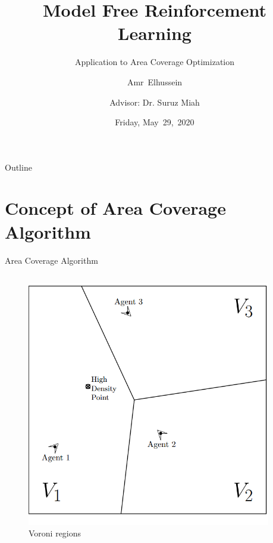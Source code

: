 \documentclass{beamer}
\title{Model Free Reinforcement Learning}
\subtitle{Application to Area Coverage Optimization}
\author[A.Elhussein]{Amr~Elhussein  \\\and
Advisor: Dr. Suruz Miah}
\institute[Bradley University] %
{
  Department of Electrical and Computer Engineering\\
  Bradley University\\
  1501 W. Bradley Avenue\\
  Peoria, IL, 61625, USA
}
\date[May~29,~2020]{Friday, May~29,~2020}
\begin{document}
\begin{frame}
  \titlepage
\end{frame}

\begin{frame}{Outline}
  \tableofcontents
\end{frame}


\section{Concept of Area Coverage Algorithm}
\begin{frame}{Area Coverage Algorithm}
\begin{columns}
\begin{column}{0.5\textwidth}
\begin{center}
\begin{figure}
\includegraphics[scale=0.2]{figs/img/voroni.png}
\caption{Voroni regions}
\end{figure}
\end{center}
\end{column}
\begin{column}{0.5\textwidth}
\begin{center}

\end{center}
\end{column}
\end{columns}
\end{frame}
\end{document}
